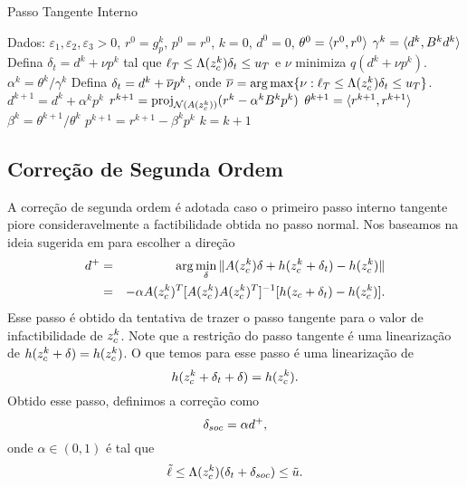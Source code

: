\begin{algorithm}[H]
\caption{Passo Tangente Interno}
\label{alg:steihaug}
\begin{algorithmic}[1]
\State Dados: $\varepsilon_1, \varepsilon_2, \varepsilon_3 > 0$, $r^0 = g_p^k$,
  $p^0 = r^0$, $k = 0$, $d^0 = 0$, $\theta^{0} = \langle {r^{0}}, {r^{0}} \rangle$
  \State $\gamma^k = \langle {d^k}, {B^k d^k} \rangle$
  \State Defina $\delta_t = d^k + \nu p^k$ tal que $\ell_T \leq
      \Lambda(z_c^{k})\delta_t \leq u_T$ e $\nu$ minimiza $q(d^k + \nu
      p^k)$.
  \EndIf
  \State $\alpha^k = \theta^k/\gamma^k$
    \State Defina $\delta_t = d^k + \overline{\nu} p^k$, onde
    $\overline{\nu} = \arg\max\{\nu : \ell_T \leq \Lambda(z_c^{k})\delta_t \leq u_T\}$.
  \EndIf
  \State $d^{k+1} = d^k + \alpha^kp^k$
  \State $r^{k+1} = \mbox{proj}_{\mathcal{N}(A(z_c^{k}))}(r^k - \alpha^k B^k p^k)$
  \State $\theta^{k+1} = \langle {r^{k+1}}, {r^{k+1}} \rangle$
  \State $\beta^k = \theta^{k+1}/\theta^k$
  \State $p^{k+1} = r^{k+1} - \beta^kp^k$
  \State $k = k + 1$
\EndWhile
\end{algorithmic}
\end{algorithm}

\subsection{Correção de Segunda Ordem}

A correção de segunda ordem é adotada caso o primeiro passo interno tangente
piore consideravelmente a factibilidade obtida no passo normal. 
Nos baseamos na ideia sugerida em \cite{bib:book-nocedal} para escolher a direção
\begin{eqnarray*}
  d^+ & = & \arg\min_{\delta} \Vert A(z_c^{k})\delta + h(z_c^{k} + \delta_t) -
    h(z_c^{k})\Vert \\
  & = & -\alpha A(z_c^{k})^T [ A(z_c^{k}) A(z_c^{k})^T]^{-1} [h(z_c + \delta_t) -
    h(z_c^{k})].
\end{eqnarray*}
Esse passo é obtido da tentativa de trazer o passo tangente para o valor de
infactibilidade de $z_c^{k}$.
Note que a restrição do passo tangente é uma linearização de $h(z_c^{k} + \delta)
= h(z_c^{k})$. O que temos para esse passo é uma linearização de
$$ h(z_c^{k} + \delta_t + \delta) = h(z_c^{k}). $$
Obtido esse passo, definimos a correção como
$$ \delta_{soc} = \alpha d^+, $$
onde $\alpha \in (0,1)$ é tal que
$$\tilde{\ell} \leq \Lambda(z_c^{k})(\delta_t + \delta_{soc}) \leq \tilde{u}.$$

